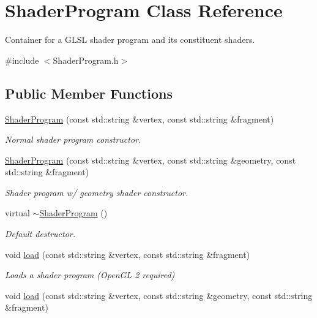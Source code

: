 \hypertarget{class_shader_program}{}\section{Shader\+Program Class Reference}
\label{class_shader_program}


Container for a G\+L\+SL shader program and its constituent shaders.  




{\ttfamily \#include $<$Shader\+Program.\+h$>$}

\subsection*{Public Member Functions}
\begin{DoxyCompactItemize}
\item 
\hyperlink{class_shader_program_a4cc1af7c22b52019885503fb16e5c837}{Shader\+Program} (const std\+::string \&vertex, const std\+::string \&fragment)
\begin{DoxyCompactList}\small\item\em Normal shader program constructor. \end{DoxyCompactList}\item 
\hyperlink{class_shader_program_af16e52eb0d138a14e33902b7ec313a6b}{Shader\+Program} (const std\+::string \&vertex, const std\+::string \&geometry, const std\+::string \&fragment)
\begin{DoxyCompactList}\small\item\em Shader program w/ geometry shader constructor. \end{DoxyCompactList}\item 
virtual \hyperlink{class_shader_program_a2d2eadcfc48cc2e2ddb82aba70553a9f}{$\sim$\+Shader\+Program} ()
\begin{DoxyCompactList}\small\item\em Default destructor. \end{DoxyCompactList}\item 
void \hyperlink{class_shader_program_a2231dc8ed81e75d4f36260b90cb19f4a}{load} (const std\+::string \&vertex, const std\+::string \&fragment)
\begin{DoxyCompactList}\small\item\em Loads a shader program (Open\+GL 2 required) \end{DoxyCompactList}\item 
void \hyperlink{class_shader_program_a69a116f12f5f9fcf8c7b4f97c15bb2da}{load} (const std\+::string \&vertex, const std\+::string \&geometry, const std\+::string \&fragment)

\end{DoxyCompactItemize}
